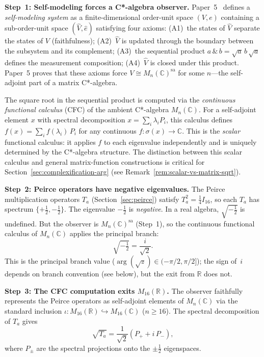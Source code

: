 \medskip
\noindent\textbf{Step~1: Self-modeling forces a C*-algebra observer.}
Paper~5~\cite{Paper5} defines a \emph{self-modeling system} as a
finite-dimensional order-unit space $(V, e)$ containing a
sub-order-unit space $(\hat{V}, \hat{e})$ satisfying four axioms:
(A1)~the states of $\hat{V}$ separate the states of $V$
(faithfulness); (A2)~$\hat{V}$ is updated through the boundary
between the subsystem and its complement; (A3)~the sequential product
$a\,\&\,b = \sqrt{a}\,b\,\sqrt{a}$ defines the measurement
composition; (A4)~$\hat{V}$ is closed under this product.
Paper~5 proves that these axioms force $V \cong
M_n(\mathbb{C})^{\mathrm{sa}}$ for some $n$---the self-adjoint
part of a matrix C*-algebra.

The square root in the sequential product is computed via the
\emph{continuous functional calculus} (CFC) of the ambient C*-algebra
$M_n(\mathbb{C})$.  For a self-adjoint element $x$ with spectral
decomposition $x = \sum_i \lambda_i P_i$, this calculus defines
$f(x) = \sum_i f(\lambda_i)\,P_i$ for any continuous
$f\colon\sigma(x)\to\mathbb{C}$.  This is the \emph{scalar}
functional calculus: it applies $f$ to each eigenvalue
independently and is uniquely determined by the C*-algebra
structure.  The distinction between this scalar calculus and general
matrix-function constructions is critical for
Section~\ref{sec:complexification-arg}
(see Remark~\ref{rem:scalar-vs-matrix-sqrt}).

\medskip
\noindent\textbf{Step~2: Peirce operators have negative eigenvalues.}
The Peirce multiplication operators $T_a$ (Section~\ref{sec:peirce})
satisfy $T_a^2 = \tfrac{1}{4}I_{16}$, so each $T_a$ has spectrum
$\{+\tfrac{1}{2}, -\tfrac{1}{2}\}$.  The eigenvalue $-\tfrac{1}{2}$
is \emph{negative}.  In a real algebra, $\sqrt{-\tfrac{1}{2}}$ is
undefined.  But the observer is $M_n(\mathbb{C})^{\mathrm{sa}}$
(Step~1), so the continuous functional calculus of $M_n(\mathbb{C})$
applies the principal branch:
\begin{equation}\label{eq:sqrt-neg}
  \sqrt{-\tfrac{1}{2}} = \frac{i}{\sqrt{2}}.
\end{equation}
This is the principal branch value
($\arg(\sqrt{z})\in(-\pi/2,\pi/2]$); the sign of~$i$ depends
on branch convention (see below), but the exit from $\mathbb{R}$
does not.

\medskip
\noindent\textbf{Step~3: The CFC computation exits $M_{16}(\mathbb{R})$.}
The observer faithfully represents the Peirce operators as self-adjoint
elements of $M_n(\mathbb{C})$ via the standard inclusion
$\iota: M_{16}(\mathbb{R}) \hookrightarrow M_{16}(\mathbb{C})$
($n \geq 16$).  The spectral decomposition of $T_a$ gives
\begin{equation}\label{eq:sqrt-Ta}
  \sqrt{T_a} = \frac{1}{\sqrt{2}}(P_+ + i\,P_-),
\end{equation}
where $P_\pm$ are the spectral projections onto the $\pm\tfrac{1}{2}$
eigenspaces.

